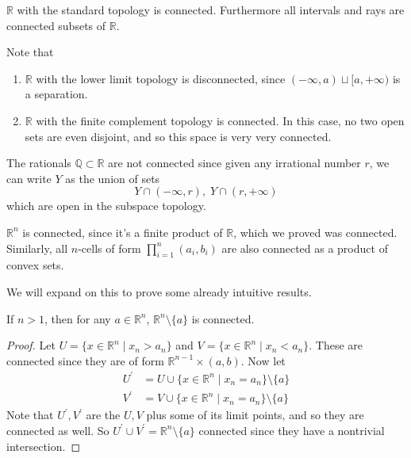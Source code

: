   \begin{corollary}
    $\mathbb{R}$ with the standard topology is connected. Furthermore all intervals and rays are connected subsets of $\mathbb{R}$. 
  \end{corollary} 

  \begin{example}
    Note that 
    \begin{enumerate}
      \item $\mathbb{R}$ with the lower limit topology is disconnected, since $(-\infty, a) \sqcup [a, +\infty)$ is a separation. 
      \item $\mathbb{R}$ with the finite complement topology is connected. In this case, no two open sets are even disjoint, and so this space is very very connected. 
    \end{enumerate}
  \end{example}

  \begin{example}
    The rationals $\mathbb{Q} \subset \mathbb{R}$ are not connected since given any irrational number $r$, we can write $Y$ as the union of sets
    \begin{equation}
      Y \cap (-\infty, r), \; Y \cap (r, +\infty)
    \end{equation}
    which are open in the subspace topology. 
  \end{example}

  \begin{example}
    $\mathbb{R}^n$ is connected, since it's a finite product of $\mathbb{R}$, which we proved was connected. Similarly, all $n$-cells of form $\prod_{i=1}^n (a_i, b_i)$ are also connected as a product of convex sets. 
  \end{example} 

  We will expand on this to prove some already intuitive results. 

  \begin{theorem}
    If $n > 1$, then for any $a \in \mathbb{R}^n$, $\mathbb{R}^n \setminus \{a\}$ is connected. 
  \end{theorem}
  \begin{proof}
    Let $U = \{x \in \mathbb{R}^n \mid x_n > a_n\}$ and $V = \{x \in \mathbb{R}^n \mid x_n < a_n\}$. These are connected since they are of form $\mathbb{R}^{n-1} \times (a, b)$. Now let 
    \begin{align}
      U^\prime & = U \cup \{x \in \mathbb{R}^n \mid x_n = a_n\} \setminus \{a\} \\
      V^\prime & = V \cup \{x \in \mathbb{R}^n \mid x_n = a_n\} \setminus \{a\} 
    \end{align}
    Note that $U^\prime, V^\prime$ are the $U, V$ plus some of its limit points, and so they are connected as well. So $U^\prime \cup V^\prime = \mathbb{R}^n \setminus \{a\}$ connected since they have a nontrivial intersection. 
  \end{proof}

